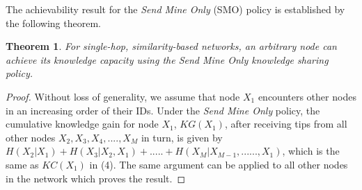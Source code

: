\documentclass[conference]{IEEEtran}
\newtheorem{theorem}{Theorem}
\theoremstyle{definition}
\begin{document}
The achievability result for the {\it Send Mine Only} (SMO) policy is established by the following theorem.
%
%
\vspace{-0.2 cm}
\begin{theorem}
For single-hop, similarity-based networks, an arbitrary node can achieve its knowledge capacity using the {\it Send Mine Only} knowledge sharing policy.
\end{theorem}
%
\vspace{-0.5 cm}
\begin{proof}
Without loss of generality, we assume that node $X_1$ encounters other nodes in an increasing order of their IDs. Under the {\it Send Mine Only} policy, 
the cumulative knowledge gain for node $X_1$, $KG(X_1)$, after receiving tips from all other nodes $X_2, X_3, X_4,...., X_M$ in turn, is given by $H(X_2|X_1) + H(X_3|X_2,X_1) + .....+ H(X_M|X_{M-1}, ......, X_1)$, which is the same as $KC(X_1)$ in (4). 
The same argument can be applied to all other nodes in the network which proves the result.
%
%
\end{proof}
\end{document}
